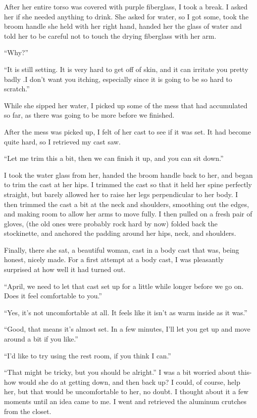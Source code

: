 After her entire torso was covered with purple fiberglass, I took a break. I asked her if she
needed anything to drink. She asked for water, so I got some, took the broom handle she held
with her right hand, handed her the glass of water and told her to be careful not to touch the
drying fiberglass with her arm.

``Why?''

``It is still setting. It is very hard to get off of skin, and it can irritate you pretty badly
.I don't want you itching, especially since it is going to be so hard to scratch.''

While she sipped her water, I picked up some of the mess that had accumulated so far, as there
was going to be more before we finished.

After the mess was picked up, I felt of her cast to see if it was set. It had become quite hard,
so I retrieved my cast saw.

``Let me trim this a bit, then we can finish it up, and you can sit down.''

I took the water glass from her, handed the broom handle back to her, and began to trim the cast
at her hips. I trimmed the cast so that it held her spine perfectly straight, but barely allowed
her to raise her legs perpendicular to her body. I then trimmed the cast a bit at the neck and
shoulders, smoothing out the edges, and making room to allow her arms to move fully. I then
pulled on a fresh pair of gloves, (the old ones were probably rock hard by now) folded back the
stockinette, and anchored the padding around her hips, neck, and shoulders.

Finally, there she sat, a beautiful woman, cast in a body cast that was, being honest, nicely
made. For a first attempt at a body cast, I was pleasantly surprised at how well it had turned
out.

``April, we need to let that cast set up for a little while longer before we go on. Does it feel
comfortable to you.''

``Yes, it's not uncomfortable at all. It feels like it isn't as warm inside as it was.''

``Good, that means it's almost set. In a few minutes, I'll let you get up and move around a bit
if you like.''

``I'd like to try using the rest room, if you think I can.''

``That might be tricky, but you should be alright.'' I was a bit worried about this- how would
she do at getting down, and then back up? I could, of course, help her, but that would be
uncomfortable to her, no doubt. I thought about it a few moments until an idea came to me. I
went and retrieved the aluminum crutches from the closet.

